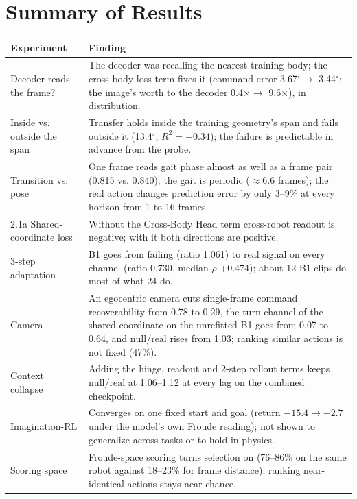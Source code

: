 \documentclass[12pt,a4paper,oneside]{report}
\begin{document}
\section{Summary of Results}
\begin{center}
\footnotesize
\setlength{\tabcolsep}{3pt}
\begin{tabularx}{\textwidth}{>{\hsize}Y>{\hsize}Y}
\toprule
\textbf{Experiment} & \textbf{Finding}\\
 Decoder reads the frame? & The decoder was recalling the nearest training body; the cross-body loss term fixes it (command error 3.67$^\circ \to$ 3.44$^\circ$; the image's worth to the decoder 0.4$\times \to$ 9.6$\times$), in distribution.\\
 Inside vs. outside the span & Transfer holds inside the training geometry's span and fails outside it (13.4$^\circ$, $R^2=-0.34$); the failure is predictable in advance from the probe.\\
 Transition vs. pose & One frame reads gait phase almost as well as a frame pair (0.815 vs. 0.840); the gait is periodic ($\approx$6.6 frames); the real action changes prediction error by only 3--9\% at every horizon from 1 to 16 frames.\\
\addlinespace[3pt]
2.1a Shared-coordinate loss & Without the Cross-Body Head term cross-robot readout is negative; with it both directions are positive.\\
 3-step adaptation & B1 goes from failing (ratio 1.061) to real signal on every channel (ratio 0.730, median $\rho$ +0.474); about 12 B1 clips do most of what 24 do.\\
 Camera & An egocentric camera cuts single-frame command recoverability from 0.78 to 0.29, the turn channel of the shared coordinate on the unrefitted B1 goes from 0.07 to 0.64, and $\mathrm{null}/\mathrm{real}$ rises from 1.03; ranking similar actions is not fixed (47\%).\\
 Context collapse & Adding the hinge, readout and 2-step rollout terms keeps $\mathrm{null}/\mathrm{real}$ at 1.06--1.12 at every lag on the combined checkpoint.\\
 Imagination-RL & Converges on one fixed start and goal (return $-15.4 \to -2.7$ under the model's own Froude reading); not shown to generalize across tasks or to hold in physics.\\
 Scoring space & Froude-space scoring turns selection on (76--86\% on the same robot against 18--23\% for frame distance); ranking near-identical actions stays near chance.\\

\end{tabularx}
\end{center}
\end{document}
